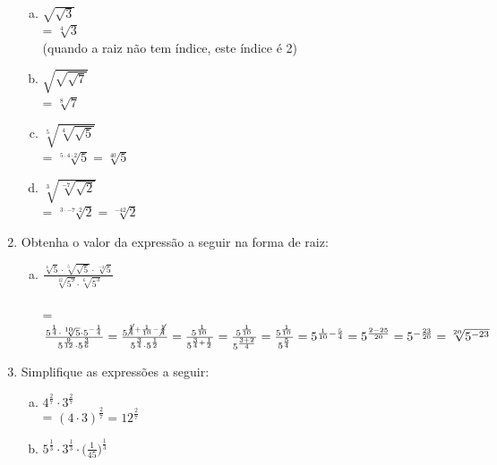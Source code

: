 \documentclass[a4paper,14pt]{article}
\begin{document}
\begin{multicols}{2}
\begin{enumerate}
        \begin{enumerate}[a)]
        	\item $\sqrt{\sqrt{3}}$\\
        	= $\sqrt[4]{3}$ \\(quando a raiz não tem índice, este índice é 2)
        	\item $\sqrt{\sqrt{\sqrt{7}}}$\\
        	= $\sqrt[8]{7}$
        	\item $\sqrt[5]{\sqrt[4]{\sqrt{5}}}$\\
        	= $\sqrt[5 \cdot 4 \cdot 2]{5}
        	= \sqrt[40]{5}$\\
        	\item $\sqrt[3]{\sqrt[-7]{\sqrt{2}}}$\\
        	= $\sqrt[3 \cdot -7 \cdot 2]{2}
        	= \sqrt[-42]{2}$
        \end{enumerate}
        \item Obtenha o valor da expressão a seguir na forma de raiz:
        \begin{enumerate}[a)]
        	\item $\frac{\sqrt[4]{5} \cdot \sqrt[5]{\sqrt{5}} \cdot \sqrt[-4]{5}}{\sqrt[12]{5^9} \cdot \sqrt[6]{5^3}}$\\\\
        	= $\frac{5^\frac{1}{4} \cdot \sqrt[10]{5} \cdot 5^{-\frac{1}{4}}}{5^\frac{9}{12} \cdot 5^\frac{3}{6}}
        	= \frac{5^{\cancel{\frac{1}{4}} + \frac{1}{10} - \cancel{\frac{1}{4}}}}{5^\frac{3}{4} \cdot 5^\frac{1}{2}} \\\\
        	= \frac{5^\frac{1}{10}}{5^{\frac{3}{4} + \frac{1}{2}}}
        	= \frac{5^\frac{1}{10}}{5^{\frac{3 + 2}{4}}} 
        	= \frac{5^\frac{1}{10}}{5^\frac{5}{4}} \\\\
        	= 5^{\frac{1}{10} - \frac{5}{4}}
        	= 5^\frac{2 - 25}{20}
        	= 5^{-\frac{23}{20}} \\\\
        	= \sqrt[20]{5^{-23}}$
        \end{enumerate}
        \item Simplifique as expressões a seguir:
        \begin{enumerate}[a)]
        	\item $4^\frac{2}{7} \cdot 3^\frac{2}{7}$\\
        	= $(4 \cdot 3)^\frac{2}{7} 
        	= 12^\frac{2}{7}$
        	\item $5^\frac{1}{3} \cdot 3^\frac{1}{3} \cdot \bigg(\frac{1}{45}\bigg)^\frac{1}{3}$\\

\end{enumerate}
\end{enumerate}
\end{multicols}
\end{document}
